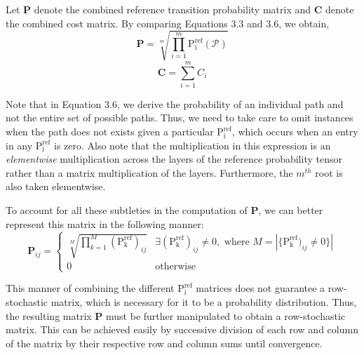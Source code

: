Let $\mathbf{P}$ denote the combined reference transition probability matrix and $\mathbf{C}$ denote the combined cost matrix. By comparing Equations 3.3 and 3.6, we obtain,
\begin{equation}
\mathbf{P} = \sqrt[m]{\prod\limits_{i=1}^{m}\mathrm{P_i^{ref}}(\mathcal{P})}
\end{equation}
\begin{equation}
\mathbf{C} = \sum\limits_{i=1}^{m} C_i
\end{equation}

Note that in Equation 3.6, we derive the probability of an individual path and not the entire set of possible paths. Thus, we need to take care to omit instances when the path does not exists given a particular $\mathrm{P_i^{ref}}$, which occurs when an entry in any $\mathrm{P_i^{ref}}$ is zero. Also note that the multiplication in this expression is an \emph{elementwise} multiplication across the layers of the reference probability tensor rather than a matrix multiplication of the layers. Furthermore, the $m^{th}$ root is also taken elementwise.

To account for all these subtleties in the computation of $\mathbf{P}$, we can better represent this matrix in the following manner:
\begin{equation}
\mathbf{P}_{ij} = \left\{
                \begin{array}{ll}
                 \sqrt[M]{ \prod\limits_{k=1}^{M} (\mathrm{P_k^{ref}})_{ij}  } & \exists (\mathrm{P_k^{ref}})_{ij} \neq 0, \text{ where }M = |\{\mathrm{P_k^{ref}})_{ij} \neq 0  \} | \\
                 0  & \text{otherwise } 
                \end{array}
              \right.
\end{equation}

This manner of combining the different $\mathrm{P_i^{ref}}$ matrices does not guarantee a row-stochastic matrix, which is necessary for it to be a probability distribution. Thus, the resulting matrix $\mathbf{P}$ must be further manipulated to obtain a row-stochastic matrix. This can be achieved easily by successive division of each row and column of the matrix by their respective row and column sums until convergence.

